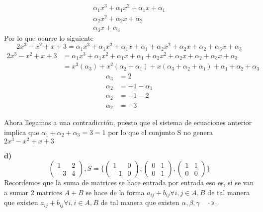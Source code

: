 \documentclass[letterpaper]{article}
\newcommand{\tq}{ \quad \cdot  \backepsilon \cdot \quad }
\renewcommand{\*}{\cdot}
\theoremstyle{definition}
\begin{document}
\begin{eqnarray*}
	\alpha_1 x^3 + \alpha_1 x^2 + \alpha_1 x + \alpha_1 	\\
	\alpha_2 x^2 + \alpha_2 x + \alpha_2 \\
	\alpha_3 x + \alpha_3 
\end{eqnarray*}
Por lo que ocurre lo siguiente
\[ 2x^3 - x^2 + x + 3 = \alpha_1 x^3 + \alpha_1 x^2 + \alpha_1 x + \alpha_1 + \alpha_2 x^2 + \alpha_2 x + \alpha_2 +\alpha_3 x + \alpha_3  \]
\begin{eqnarray*}
2x^3 - x^2 + x + 3 &= \alpha_1 x^3 + \alpha_1 x^2 + \alpha_1 x + \alpha_1 + \alpha_2 x^2 + \alpha_2 x + \alpha_2 +\alpha_3 x + \alpha_3 \\
 &= x^3 (\alpha_3)  + x^2 (\alpha_2 + \alpha_1) + x(\alpha_3 + \alpha_2 + \alpha_1) + \alpha_1 + \alpha_2 + \alpha_3
 \end{eqnarray*}
 \begin{align*}
	\alpha_3 &=  2\\
	\alpha_2 &= -1 - \alpha_1 \\
	\alpha_2 &= -1 - 2\\
	\alpha_2 &= -3
\end{align*}

Ahora llegamos a una contradicción, puesto que el sistema de ecuaciones anterior implica que $\alpha_1 + \alpha_2 + \alpha_3 = 3 = 1$ por lo que el conjunto S no genera $ 2x^3 - x^2 + x + 3$

\textbf{d)} $$ \begin{pmatrix} 1 & 2 \\ -3 & 4 \end{pmatrix},  S =  \lbrace \begin{pmatrix} 1 & 0 \\ -1 & 0 \end{pmatrix} , \begin{pmatrix} 0 & 1 \\ 0 &1 \end{pmatrix} , \begin{pmatrix} 1 & 1 \\ 0 &0 \end{pmatrix} \rbrace$$
Recordemos que la suma de matrices se hace entrada por entrada eso es, si se van a sumar 2 matrices $A + B$ se hace de la forma $a_{ij} + b_{ij}  \forall i,j \in A,B$ de tal manera que existen  $a_{ij} + b_{ij}  \forall i,i \in A,B$ de tal manera que existen $\alpha, \beta, \gamma \tq $
\end{document}
